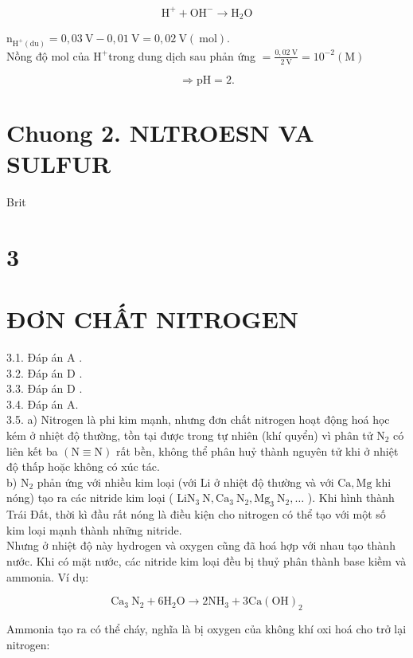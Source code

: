 \documentclass[10pt]{article}
\begin{document}
$$
\mathrm{H}^{+}+\mathrm{OH}^{-} \rightarrow \mathrm{H}_{2} \mathrm{O}
$$

$\mathrm{n}_{\mathrm{H}^{+}(\mathrm{d} \mathrm{u})}=0,03 \mathrm{~V}-0,01 \mathrm{~V}=0,02 \mathrm{~V}(\mathrm{~mol})$.\\
Nồng độ mol của $\mathrm{H}^{+}$trong dung dịch sau phản ứng $=\frac{0,02 \mathrm{~V}}{2 \mathrm{~V}}=10^{-2}(\mathrm{M})$

$$
\Rightarrow \mathrm{pH}=2 .
$$

\section*{Chuong 2. NLTROESN VA SULFUR}
Brit

\section*{3}
\section*{ĐƠN CHẤT NITROGEN}
3.1. Đáp án A .\\
3.2. Đáp án D .\\
3.3. Đáp án D .\\
3.4. Đáp án A.\\
3.5. a) Nitrogen là phi kim mạnh, nhưng đơn chất nitrogen hoạt động hoá học kém ở nhiệt độ thường, tồn tại được trong tự nhiên (khí quyển) vì phân tử $\mathrm{N}_{2}$ có liên kết ba $(\mathrm{N} \equiv \mathrm{N})$ rất bền, không thể phân huỷ thành nguyên tử khi ở nhiệt độ thấp hoặc không có xúc tác.\\
b) $\mathrm{N}_{2}$ phản ứng với nhiều kim loại (với Li ở nhiệt độ thường và với $\mathrm{Ca}, \mathrm{Mg}$ khi nóng) tạo ra các nitride kim loại ( $\mathrm{Li} \mathrm{N}_{3} \mathrm{~N}, \mathrm{Ca}_{3} \mathrm{~N}_{2}, \mathrm{Mg}_{3} \mathrm{~N}_{2}, \ldots$ ). Khi hình thành Trái Đất, thời kì đầu rất nóng là điều kiện cho nitrogen có thể tạo với một số kim loại mạnh thành những nitride.\\
Nhưng ở nhiệt độ này hydrogen và oxygen cũng đã hoá hợp với nhau tạo thành nước. Khi có mặt nước, các nitride kim loại đều bị thuỷ phân thành base kiềm và ammonia. Ví dụ:

$$
\mathrm{Ca}_{3} \mathrm{~N}_{2}+6 \mathrm{H}_{2} \mathrm{O} \rightarrow 2 \mathrm{NH}_{3}+3 \mathrm{Ca}(\mathrm{OH})_{2}
$$

Ammonia tạo ra có thể cháy, nghĩa là bị oxygen của không khí oxi hoá cho trở lại nitrogen:
\end{document}
